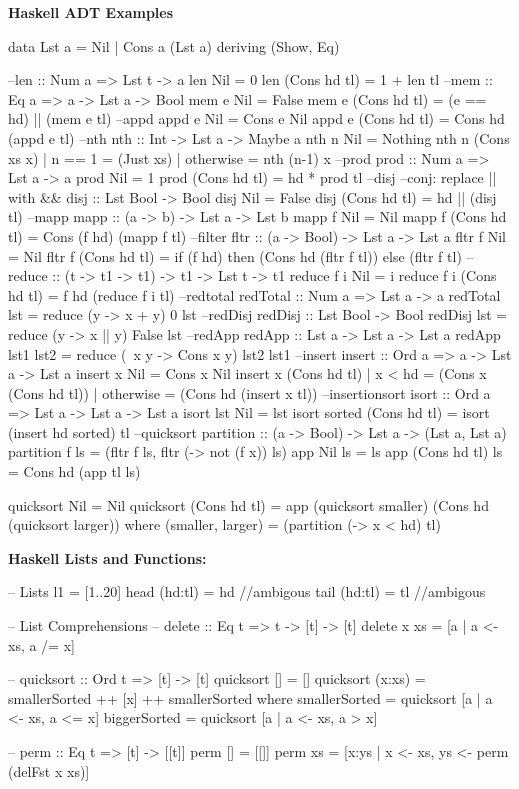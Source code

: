 \begin{breakbox}
\textbf{Haskell ADT Examples}
\begin{haskellcode}
data Lst a = Nil | Cons a (Lst a) deriving (Show, Eq)

--len :: Num a => Lst t -> a
len Nil = 0
len (Cons hd tl) = 1 + len tl
--mem :: Eq a => a -> Lst a -> Bool
mem e Nil = False
mem e (Cons hd tl) = (e == hd) || (mem e tl)
--appd
appd e Nil = Cons e Nil
appd e (Cons hd tl) = Cons hd (appd e tl)
--nth
nth :: Int -> Lst a -> Maybe a
nth n Nil = Nothing
nth n (Cons xs x) | n == 1 = (Just xs)
                  | otherwise = nth (n-1) x
--prod
prod :: Num a => Lst a -> a
prod Nil = 1
prod (Cons hd tl) = hd * prod tl
--disj --conj: replace || with &&
disj :: Lst Bool -> Bool
disj Nil = False
disj (Cons hd tl) = hd || (disj tl)
--mapp
mapp :: (a -> b) -> Lst a -> Lst b
mapp f Nil = Nil
mapp f (Cons hd tl) = Cons (f hd) (mapp f tl)
--filter
fltr :: (a -> Bool) -> Lst a -> Lst a
fltr f Nil = Nil
fltr f (Cons hd tl) = if (f hd) then 
			(Cons hd (fltr f tl)) else (fltr f tl)
--reduce :: (t -> t1 -> t1) -> t1 -> Lst t -> t1
reduce f i Nil = i
reduce f i (Cons hd tl) = f hd (reduce f i tl)
--redtotal
redTotal :: Num a => Lst a -> a
redTotal lst = reduce (\x y -> x + y) 0 lst
--redDisj
redDisj :: Lst Bool -> Bool
redDisj lst = reduce (\x y -> x || y) False lst
--redApp
redApp :: Lst a -> Lst a -> Lst a
redApp lst1 lst2 = reduce (\ x y -> Cons x y) lst2 lst1
--insert
insert :: Ord a => a -> Lst a -> Lst a
insert x Nil = Cons x Nil
insert x (Cons hd tl) | x < hd = (Cons x (Cons hd tl))
                      | otherwise = (Cons hd (insert x tl))
--insertionsort
isort :: Ord a => Lst a -> Lst a -> Lst a
isort lst Nil = lst
isort sorted (Cons hd tl) = isort (insert hd sorted) tl
--quicksort
partition :: (a -> Bool) -> Lst a -> (Lst a, Lst a)
partition f ls = (fltr f ls, fltr (\x -> not (f x)) ls)
app Nil ls = ls
app (Cons hd tl) ls = Cons hd (app tl ls)

quicksort Nil = Nil
quicksort (Cons hd tl) = app (quicksort smaller) 
			(Cons hd (quicksort larger))
  where
    (smaller, larger) = (partition (\x -> x < hd) tl)
\end{haskellcode}
\end{breakbox}

\begin{breakbox}
\textbf{Haskell Lists and Functions:}\\
\begin{haskellcode}
-- Lists
l1 = [1..20]
head (hd:tl) = hd //ambigous
tail (hd:tl) = tl //ambigous
	
-- List Comprehensions
-- delete :: Eq t => t -> [t] -> [t]
delete x xs = [a | a <- xs, a /= x]
 
-- quicksort :: Ord t => [t] -> [t]
quicksort [] = []  
quicksort (x:xs) = smallerSorted ++ [x] ++ smallerSorted
	where
		smallerSorted = quicksort [a | a <- xs, a <= x]
		biggerSorted = quicksort [a | a <- xs, a > x]

-- perm :: Eq t => [t] -> [[t]]
perm [] = [[]]
perm xs = [x:ys | x <- xs, ys <- perm (delFst x xs)]
\end{haskellcode}
\end{breakbox}


